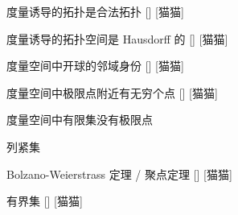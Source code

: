 \documentclass[UTF8]{ctexart}
\begin{document}
            \begin{ppt}
                []
                {度量诱导的拓扑是合法拓扑}
                []
                [猫猫]
            \end{ppt}

            \begin{ppt}
                []
                {度量诱导的拓扑空间是 Hausdorff 的}
                []
                [猫猫]
            \end{ppt}

            \begin{ppt}
                []
                {度量空间中开球的邻域身份}
                []
                [猫猫]
            \end{ppt}

            \begin{thm}
                []
                {度量空间中极限点附近有无穷个点}
                []
                [猫猫]
                
            \end{thm}

            \begin{crl}
                {度量空间中有限集没有极限点}
            \end{crl}

            \begin{dfn}
                {列紧集}
            \end{dfn}

            \begin{thm}
                []
                {Bolzano-Weierstrass 定理 / 聚点定理}
                []
                [猫猫]
            \end{thm}

            \begin{dfn}
                []
                {有界集}
                []
                [猫猫]
            \end{dfn}
            
\end{document}
